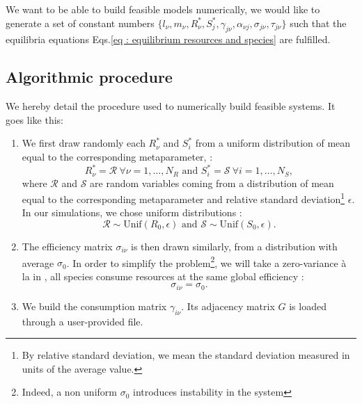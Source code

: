\documentclass[12pt, titlepage]{report}
\begin{document}
We want to be able to build feasible models numerically, \ie we would like to generate a set of constant numbers $\{
l_\nu, m_\nu, R^*_\nu, S^*_j, \gamma_{j\nu}, \alpha_{\nu j}, \sigma_{j\nu}, \tau_{j\nu}\}$ such that the equilibria equations Eqs.\eqref{eq : equilibrium resources and species} are fulfilled.


\subsection{Algorithmic procedure}
We hereby detail the procedure used to numerically build feasible systems. It goes like this:
\begin{enumerate}
  \item We first draw randomly each $R^*_\nu$
  and $S^*_i$ from a uniform distribution of mean equal to the corresponding metaparameter, \ie :
  \begin{equation}
     R^*_\nu = \mathcal{R} \ \forall \nu=1, \dots, N_R\text{ and }  S^*_i = \mathcal{S} \ \forall i=1, \dots, N_S,
  \end{equation}
  where $\mathcal{R}$ and $\mathcal{S}$ are random variables coming from a distribution of mean equal to the corresponding metaparameter and relative standard deviation\footnote{By relative standard deviation, we mean the standard deviation measured in units of the average value.} $\epsilon$. In our simulations, we chose uniform distributions :
  \begin{equation}
  \mathcal{R} \sim \text{Unif}(R_0, \epsilon) \text{ and } \mathcal{S} \sim \text{Unif}(S_0, \epsilon).
  \end{equation}
  \item The efficiency matrix $\sigma_{i\nu}$ is then drawn similarly, from a distribution with average $\sigma_0$. In order to simplify the problem\footnote{Indeed, a non uniform $\sigma_0$ introduces instability in the system}, we will take a zero-variance à la \citeauthor{butler_stability_2018} in \cite{butler_stability_2018}, \ie all species consume resources at the same global efficiency :
  \begin{equation}
    \sigma_{i\nu} = \sigma_0.
  \end{equation}
  \item We build the consumption matrix $\gamma_{i\nu}$. Its adjacency matrix $G$ is loaded through a user-provided file.

\end{enumerate}
\end{document}
